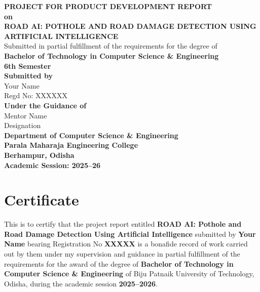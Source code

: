 \documentclass[12pt,a4paper]{report}
\begin{document}
\begin{titlepage}
\centering

{\Large \textbf{PROJECT FOR PRODUCT DEVELOPMENT REPORT}}\\[0.5cm]

{\Large \textbf{on}}\\[0.5cm]

{\Huge \textbf{ROAD AI: POTHOLE AND ROAD DAMAGE DETECTION USING ARTIFICIAL INTELLIGENCE}}\\[1.5cm]

Submitted in partial fulfillment of the requirements for the degree of\\
\textbf{Bachelor of Technology in Computer Science \& Engineering}\\[1cm]
\textbf{6th Semester}\\[0.3cm]


\textbf{Submitted by}\\[0.3cm]
Your Name\\
Regd No: XXXXXX\\[1cm]

\textbf{Under the Guidance of}\\[0.3cm]
Mentor Name\\
Designation\\[1cm]

\textbf{Department of Computer Science \& Engineering}\\
\textbf{Parala Maharaja Engineering College}\\
\textbf{Berhampur, Odisha}\\[1cm]

\textbf{Academic Session: 2025--26}

\end{titlepage}

\chapter*{Certificate}
This is to certify that the project report entitled \textbf{ROAD AI: Pothole and Road Damage Detection Using Artificial Intelligence} submitted by \textbf{Your Name} bearing Registration No \textbf{XXXXX} is a bonafide record of work carried out by them under my supervision and guidance in partial fulfillment of the requirements for the award of the degree of \textbf{Bachelor of Technology in Computer Science \& Engineering} of Biju Patnaik University of Technology, Odisha, during the academic session \textbf{2025--2026}.\\[1.5cm]
\end{document}
